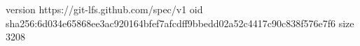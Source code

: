 version https://git-lfs.github.com/spec/v1
oid sha256:6d034e65868ee3ac920164bfef7afcdff9bbedd02a52c4417c90c838f576e7f6
size 3208
